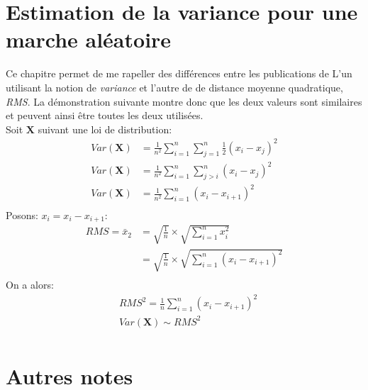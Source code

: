 \documentclass[12pt, oneside]{report}
\begin{document}
\chapter*{Estimation de la variance pour une marche aléatoire}
Ce chapitre permet de me rapeller des différences entre les publications de \cite{Yang201445,Gutowski2001}
L’un utilisant la notion de \emph{variance} et l’autre de de distance moyenne quadratique, \emph{RMS}.
La démonstration suivante montre donc que les deux valeurs sont similaires et peuvent ainsi être toutes
les deux utilisées.\\
Soit $\mathbf{X}$ suivant une loi de distribution:
\begin{equation}
    \begin{split}
        Var(\mathbf{X}) &= \frac{1}{n^{2}} \sum_{i=1}^{n} \sum_{j=1}^{n} \frac{1}{2}(x_{i} - x_{j})^{2}\\
        Var(\mathbf{X}) &= \frac{1}{n^{2}} \sum_{i=1}^{n} \sum_{j>i}^{n} (x_{i} - x_{j})^{2}\\
        Var(\mathbf{X}) &= \frac{1}{n^{2}} \sum_{i=1}^{n} (x_{i} - x_{i+1})^{2}\\
    \end{split}
\end{equation}
Posons:  $x_{i} = x_{i} - x_{i+1}$:
\begin{equation}
    \begin{split}
        RMS = \bar{x}_{2} &= \sqrt{\frac{1}{n}} \times \sqrt{\sum_{i=1}^{n}x_{i}^{2}}\\
                          &= \sqrt{\frac{1}{n}} \times \sqrt{\sum_{i=1}^{n}(x_{i} - x_{i+1})^{2}}\\
    \end{split}
\end{equation}
On a alors:
\begin{align*}
    & RMS^{2} = \frac{1}{n} \sum_{i=1}^{n}(x_{i} - x_{i+1})^{2} \\
    & Var(\mathbf{X}) \sim RMS^{2}\\
\end{align*}

\chapter*{Autres notes}
\end{document}
